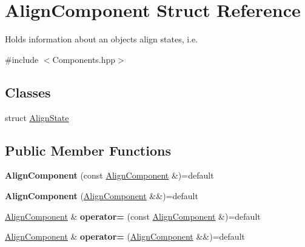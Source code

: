 \hypertarget{struct_align_component}{}\section{Align\+Component Struct Reference}
\label{struct_align_component}


Holds information about an objects align states, i.\+e.  




{\ttfamily \#include $<$Components.\+hpp$>$}

\subsection*{Classes}
\begin{DoxyCompactItemize}
\item 
struct \hyperlink{struct_align_component_1_1_align_state}{Align\+State}
\end{DoxyCompactItemize}
\subsection*{Public Member Functions}
\begin{DoxyCompactItemize}
\item 
{\bfseries Align\+Component} (const \hyperlink{struct_align_component}{Align\+Component} \&)=default\hypertarget{struct_align_component_a1eb416a6223ac7f9c1aee28e41100799}{}\label{struct_align_component_a1eb416a6223ac7f9c1aee28e41100799}

\item 
{\bfseries Align\+Component} (\hyperlink{struct_align_component}{Align\+Component} \&\&)=default\hypertarget{struct_align_component_a194311cf2534af85c0f064aed422c1af}{}\label{struct_align_component_a194311cf2534af85c0f064aed422c1af}

\item 
\hyperlink{struct_align_component}{Align\+Component} \& {\bfseries operator=} (const \hyperlink{struct_align_component}{Align\+Component} \&)=default\hypertarget{struct_align_component_a121621742f5c421c46f6669a8ccb9684}{}\label{struct_align_component_a121621742f5c421c46f6669a8ccb9684}

\item 
\hyperlink{struct_align_component}{Align\+Component} \& {\bfseries operator=} (\hyperlink{struct_align_component}{Align\+Component} \&\&)=default\hypertarget{struct_align_component_a097699c3fbfa6b02e2fa32ef08806b81}{}\label{struct_align_component_a097699c3fbfa6b02e2fa32ef08806b81}

\end{DoxyCompactItemize}
